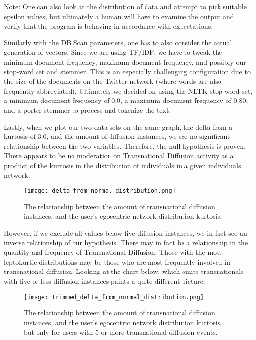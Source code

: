 Note: One can also look at the distribution of data and attempt to
pick suitable epsilon values, but ultimately a human will have to
examine the output and verify that the program is behaving in
accordance with expectations.

Similarly with the DB Scan parameters, one has to also consider the
actual generation of vectors. Since we are using TF/IDF, we have to
tweak the minimum document frequency, maximum document frequency, and
possibly our stop-word set and stemmer. This is an especially
challenging configuration due to the size of the documents on the
Twitter network (where words are also frequently
abbreviated). Ultimately we decided on using the NLTK stop-word set, a
minimum document frequency of 0.0, a maximum document frequency of
0.80, and a porter stemmer to process and tokenize the text.

Lastly, when we plot our two data sets on the same graph, the delta
from a kurtosis of 3.0, and the amount of diffusion instances, we see
no significant relationship between the two variables. Therefore, the
null hypothesis is proven. There appears to be no moderation on
Transnational Diffusion activity as a product of the kurtosis in the
distribution of individuals in a given individuals network.
\begin{figure}[H]
  \centering
  \texttt{[image: delta\_from\_normal\_distribution.png]}
  \caption{The relationship between the amount of transnational diffusion instances, and the user's egocentric network distribution kurtosis.}
\end{figure}

However, if we exclude all values below five diffusion instances, we
in fact see an inverse relationship of our hypothesis. There may in fact
be a relationship in the quantity and frequency of Transnational
Diffusion. Those with the most leptokurtic distributions may be those
who are most frequently involved in transnational diffusion. Looking at the
chart below, which omits transnationals with five or less diffusion instances
paints a quite different picture:
\begin{figure}[H]
  \centering
  \texttt{[image: trimmed\_delta\_from\_normal\_distribution.png]}
  \caption{The relationship between the amount of transnational diffusion instances, and the user's egocentric network distribution kurtosis, but only for users with 5 or more transnational diffusion events.}
\end{figure}
